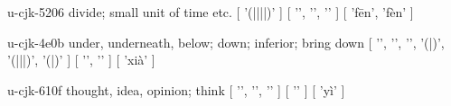 \begin{multicols}{2}
\lettrine[lines=3]{\cjkgGlue{}}{}\begin{minipage}{0.8\linewidth} u-cjk-5206  divide; small unit of time etc.  [ '\cjkgGlue{}(\cjkgGlue{}|\cjkgGlue{}|\cjkgGlue{}|\cjkgGlue{}|\cjkgGlue{})' ]  [ '\cjkgGlue{}', '\cjkgGlue{}', '\cjkgGlue{}' ]  [ 'fēn', 'fèn' ] \end{minipage}

\lettrine[lines=3]{\cjkgGlue{}}{}\begin{minipage}{0.8\linewidth} u-cjk-4e0b  under, underneath, below; down; inferior; bring down  [ '\cjkgGlue{}', '\cjkgGlue{}', '\cjkgGlue{}', '\cjkgGlue{}(\cjkgGlue{}|\cjkgGlue{})', '\cjkgGlue{}(\cjkgGlue{}|\cjkgGlue{}|\cjkgGlue{}|\cjkgGlue{})', '\cjkgGlue{}(\cjkgGlue{}|\cjkgGlue{})' ]  [ '\cjkgGlue{}', '\cjkgGlue{}' ]  [ 'xià' ] \end{minipage}

\lettrine[lines=3]{\cjkgGlue{}}{}\begin{minipage}{0.8\linewidth} u-cjk-610f  thought, idea, opinion; think  [ '\cjkgGlue{}', '\cjkgGlue{}', '\cjkgGlue{}' ]  [ '\cjkgGlue{}' ]  [ 'yì' ] \end{minipage}


\end{multicols}
